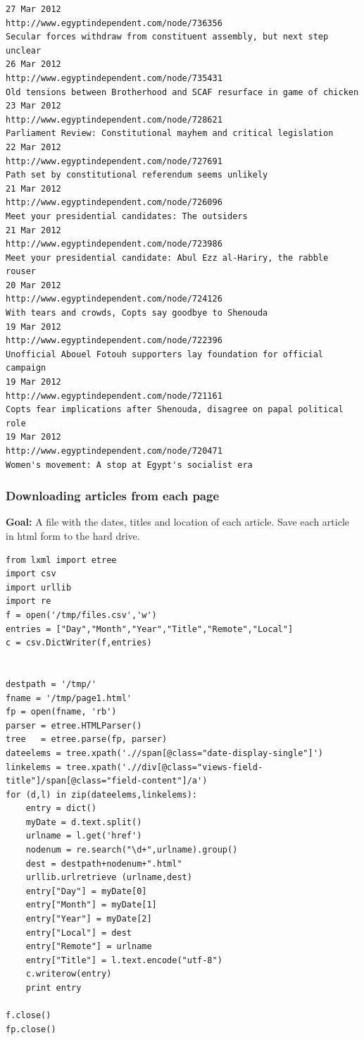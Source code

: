 \documentclass[11pt]{article}
\begin{document}
\begin{verbatim}
27 Mar 2012
http://www.egyptindependent.com/node/736356
Secular forces withdraw from constituent assembly, but next step unclear
26 Mar 2012
http://www.egyptindependent.com/node/735431
Old tensions between Brotherhood and SCAF resurface in game of chicken
23 Mar 2012
http://www.egyptindependent.com/node/728621
Parliament Review: Constitutional mayhem and critical legislation
22 Mar 2012
http://www.egyptindependent.com/node/727691
Path set by constitutional referendum seems unlikely
21 Mar 2012
http://www.egyptindependent.com/node/726096
Meet your presidential candidates: The outsiders
21 Mar 2012
http://www.egyptindependent.com/node/723986
Meet your presidential candidate: Abul Ezz al-Hariry, the rabble rouser
20 Mar 2012
http://www.egyptindependent.com/node/724126
With tears and crowds, Copts say goodbye to Shenouda
19 Mar 2012
http://www.egyptindependent.com/node/722396
Unofficial Abouel Fotouh supporters lay foundation for official campaign
19 Mar 2012
http://www.egyptindependent.com/node/721161
Copts fear implications after Shenouda, disagree on papal political role
19 Mar 2012
http://www.egyptindependent.com/node/720471
Women's movement: A stop at Egypt's socialist era
\end{verbatim}
\subsubsection{Downloading articles from each page}
\label{sec-5-3-3}

    \textbf{Goal:} A file with the dates, titles and location of each
     article.  Save each article in html form to the hard drive.

\begin{verbatim}
from lxml import etree
import csv     
import urllib
import re
f = open('/tmp/files.csv','w')
entries = ["Day","Month","Year","Title","Remote","Local"]
c = csv.DictWriter(f,entries)


destpath = '/tmp/'
fname = '/tmp/page1.html'
fp = open(fname, 'rb')
parser = etree.HTMLParser()
tree   = etree.parse(fp, parser)
dateelems = tree.xpath('.//span[@class="date-display-single"]')
linkelems = tree.xpath('.//div[@class="views-field-title"]/span[@class="field-content"]/a')
for (d,l) in zip(dateelems,linkelems):
    entry = dict()
    myDate = d.text.split()
    urlname = l.get('href')
    nodenum = re.search("\d+",urlname).group()
    dest = destpath+nodenum+".html"
    urllib.urlretrieve (urlname,dest)
    entry["Day"] = myDate[0]
    entry["Month"] = myDate[1]
    entry["Year"] = myDate[2]
    entry["Local"] = dest
    entry["Remote"] = urlname
    entry["Title"] = l.text.encode("utf-8")
    c.writerow(entry)
    print entry

f.close()
fp.close()
\end{verbatim}
\end{document}
